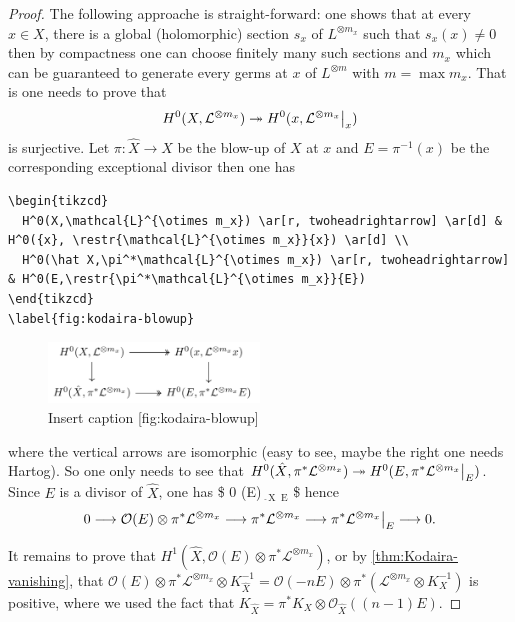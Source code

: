 \documentclass[11pt]{article}
\newcommand\restr[2]{{%
\left.\kern-\nulldelimiterspace %
#1 %
\vphantom{\big|} %
\right|_{#2} %
}}
\begin{document}
\begin{proof}
The following approache is straight-forward: one shows that at every \(x\in X\), there
is a global (holomorphic) section \(s_x\) of \(L^{\otimes m_x}\) such that \(s_x(x)\ne 0\) then by
compactness one can choose finitely many such sections and \(m_x\) which can be guaranteed to generate
every germs at \(x\) of \(L^{\otimes m}\) with \(m=\max m_x\). That is one needs to prove that
\[
H^0(X,\mathcal{L}^{\otimes m_x}) \twoheadrightarrow H^0({x}, \restr{\mathcal{L}^{\otimes m_x}}{x}) 
\] is surjective. Let \(\pi: \hat X \longrightarrow X\) be the blow-up of \(X\) at \(x\) and \(E =
\pi^{-1}(x)\) be the corresponding exceptional divisor then one has

\begin{verbatim}
\begin{tikzcd}
  H^0(X,\mathcal{L}^{\otimes m_x}) \ar[r, twoheadrightarrow] \ar[d] & H^0({x}, \restr{\mathcal{L}^{\otimes m_x}}{x}) \ar[d] \\
  H^0(\hat X,\pi^*\mathcal{L}^{\otimes m_x}) \ar[r, twoheadrightarrow] & H^0(E,\restr{\pi^*\mathcal{L}^{\otimes m_x}}{E}) 
\end{tikzcd}
\label{fig:kodaira-blowup}
\end{verbatim}

\begin{figure}[htbp]
\centering
\includegraphics[width=0.50\textwidth]{../img/2017-12-10-kodaira-blowup.png}
\caption{Insert caption [fig:kodaira-blowup]}
\end{figure}

where the vertical arrows are isomorphic (easy to see, maybe the right one needs
Hartog). So one only needs to see that  \(H^0(\hat X,\pi^*\mathcal{L}^{\otimes m_x})
\twoheadrightarrow H^0(E,\restr{\pi^*\mathcal{L}^{\otimes m_x}}{E})\). Since \(E\) is
a divisor of \(\hat X\), one has
\$
0 \longrightarrow {}(E) \longrightarrow {}\(_{\hat\ \text{X}}\) \longrightarrow
{}\(_{\text{E}}\) 
\$
hence 
\[
0 \longrightarrow \mathcal{O}(E)\otimes\pi^* \mathcal{L}^{\otimes m_x} \longrightarrow \pi^* \mathcal{L}^{\otimes m_x} \longrightarrow
\restr{\pi^*\mathcal{L}^{\otimes m_x}}{E} \longrightarrow 0.
\]

It remains to prove that \(H^1(\hat X, \mathcal{O}(E)\otimes\pi^* \mathcal{L}^{\otimes
m_x})\), or by \ref{thm:Kodaira-vanishing}, that \(\mathcal{O}(E)\otimes\pi^*
\mathcal{L}^{\otimes m_x}\otimes K_{\hat X}^{-1} = \mathcal{O}(-nE)\otimes\pi^*
(\mathcal{L}^{\otimes m_x}\otimes K_X^{-1})\) is
positive, where we used the fact that \(K_{\hat X} = \pi^* K_X\otimes \mathcal{O}_{\hat
X}((n-1)E)\). 


\end{proof}
\end{document}
